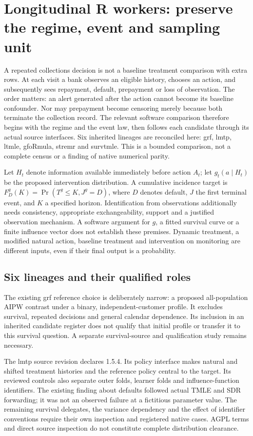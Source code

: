 
\section{Longitudinal R workers: preserve the regime, event and sampling unit}
\label{sec:exec23-longr-workers}
A repeated collections decision is not a baseline treatment comparison with
extra rows. At each visit a bank observes an eligible history, chooses an
action, and subsequently sees repayment, default, prepayment or loss of
observation. The order matters: an alert generated after the action cannot
become its baseline confounder. Nor may prepayment become censoring merely
because both terminate the collection record. The relevant software comparison
therefore begins with the regime and the event law, then follows each candidate
through its actual source interfaces. Six inherited lineages are reconciled
here: grf, lmtp, ltmle, gfoRmula, stremr and survtmle. This is a bounded comparison,
not a complete census or a finding of native numerical parity.

Let $H_t$ denote information available immediately before action $A_t$; let
$g_t(a\mid H_t)$ be the proposed intervention distribution. A cumulative
incidence target is $F_D^g(K)=\Pr(T^g\leq K,J^g=D)$, where $D$ denotes default,
$J$ the first terminal event, and $K$ a specified horizon. Identification from
observations additionally needs consistency, appropriate exchangeability,
support and a justified observation mechanism. A software argument for
$g$, a fitted survival curve or a finite influence vector does not establish
these premises. Dynamic treatment, a modified natural action, baseline
treatment and intervention on monitoring are different inputs, even if their
final output is a probability.

\subsection{Six lineages and their qualified roles}
The existing grf reference choice is deliberately narrow: a proposed
all-population AIPW contrast under a binary, independent-customer profile.
It excludes survival, repeated decisions and general calendar dependence.
Its inclusion in an inherited candidate register does not qualify that
initial profile or transfer it to this survival question. A separate
survival-source and qualification study remains necessary. \citep{exec21_grf_reuse}

The lmtp source revision declares 1.5.4. Its policy interface makes natural
and shifted treatment histories and the reference policy central to the
target. Its reviewed controls also separate outer folds, learner folds and
influence-function identifiers. The existing finding about defaults followed
actual TMLE and SDR forwarding; it was not an observed failure at a fictitious
parameter value. The remaining survival delegates, the variance dependency
and the effect of identifier conventions require their own inspection and
registered native cases. AGPL terms and direct source inspection do not
constitute complete distribution clearance. \citep{exec22_lmtp_reuse}

